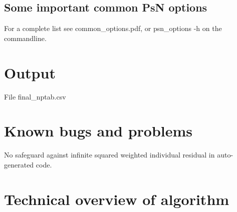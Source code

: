 \subsection{Some important common PsN options}
For a complete list see common\_options.pdf, 
or psn\_options -h on the commandline.


\section{Output}

File final\_nptab.csv

\section{Known bugs and problems}

No safeguard against infinite squared weighted individual residual in auto-generated code.

\section{Technical overview of algorithm}

